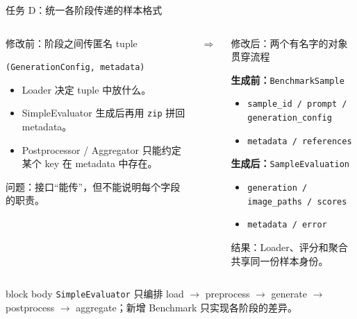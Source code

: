\documentclass[aspectratio=169,10pt]{beamer}
\begin{document}
\begin{frame}{任务 D：统一各阶段传递的样本格式}
  \begin{columns}[T,onlytextwidth]
      \begin{block}{修改前：阶段之间传匿名 tuple}
        \begin{minipage}[c][4.25cm][c]{\linewidth}
          \centering\small
          \texttt{(GenerationConfig, metadata)}
          \vspace{0.55em}
          \begin{itemize}\scriptsize
            \item Loader 决定 tuple 中放什么。
            \item SimpleEvaluator 生成后再用 \texttt{zip} 拼回 metadata。
            \item Postprocessor / Aggregator 只能约定某个 key 在 metadata 中存在。
          \end{itemize}
          \vspace{0.35em}
          \scriptsize\color{T2IRed}问题：接口“能传”，但不能说明每个字段的职责。
        \end{minipage}
      \end{block}
      \vspace{2.55cm}\centering\Large$\Longrightarrow$
      \begin{block}{修改后：两个有名字的对象贯穿流程}
        \begin{minipage}[c][4.25cm][c]{\linewidth}
          \scriptsize
          \textbf{生成前：}\texttt{BenchmarkSample}
          \begin{itemize}\scriptsize
            \item \texttt{sample\_id / prompt / generation\_config}
            \item \texttt{metadata / references}
          \end{itemize}
          \textbf{生成后：}\texttt{SampleEvaluation}
          \begin{itemize}\scriptsize
            \item \texttt{generation / image\_paths / scores}
            \item \texttt{metadata / error}
          \end{itemize}
          \vspace{0.2em}
          \scriptsize\color{T2IBlue}结果：Loader、评分和聚合共享同一份样本身份。
        \end{minipage}
      \end{block}
  \end{columns}

  \vspace{0.45em}
  \begin{beamercolorbox}[sep=0.65em,rounded=true]{block body}
    \centering\small
    \texttt{SimpleEvaluator} 只编排 load $\rightarrow$ preprocess $\rightarrow$ generate $\rightarrow$ postprocess $\rightarrow$ aggregate；新增 Benchmark 只实现各阶段的差异。
  \end{beamercolorbox}
\end{frame}
\end{document}

